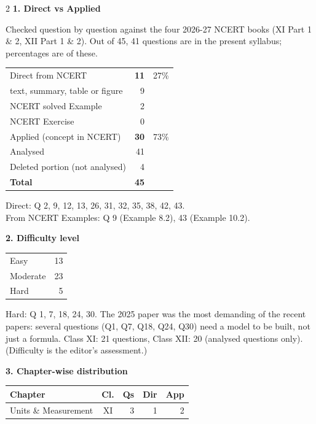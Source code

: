 \begin{multicols}{2}
\textbf{\color{crimson}1. Direct vs Applied}\par\smallskip
{\footnotesize Checked question by question against the four 2026-27 NCERT books (XI Part 1 \& 2, XII Part 1 \& 2). Out of 45, 41 questions are in the present syllabus; percentages are of these.}\par\smallskip
\begin{tabular}{@{}lrr@{}}\toprule
Direct from NCERT & \textbf{11} & 27\%\\
\quad text, summary, table or figure & 9 &\\
\quad NCERT solved Example & 2 &\\
\quad NCERT Exercise & 0 &\\
Applied (concept in NCERT) & \textbf{30} & 73\%\\\midrule
Analysed & 41 &\\
Deleted portion (not analysed) & 4 &\\\midrule
\textbf{Total} & \textbf{45} &\\\bottomrule\end{tabular}\par\smallskip
{\footnotesize Direct: Q 2, 9, 12, 13, 26, 31, 32, 35, 38, 42, 43.\\ From NCERT Examples: Q 9 (Example 8.2), 43 (Example 10.2).}\par\medskip
\textbf{\color{crimson}2. Difficulty level}\par\smallskip
\begin{tabular}{@{}lr@{}}\toprule
Easy & 13\\ Moderate & 23\\ Hard & 5\\\bottomrule\end{tabular}\par\smallskip
{\footnotesize Hard: Q 1, 7, 18, 24, 30. The 2025 paper was the most demanding of the recent papers: several questions (Q1, Q7, Q18, Q24, Q30) need a model to be built, not just a formula. Class XI: 21 questions, Class XII: 20 (analysed questions only). (Difficulty is the editor's assessment.)}\par\medskip
\columnbreak
\textbf{\color{crimson}3. Chapter-wise distribution}\par\smallskip
{\footnotesize\begin{tabular}{@{}p{4.7cm}c@{\,}r@{\,}r@{\,}r@{}}\toprule
Chapter & Cl. & Qs & Dir & App\\\midrule
Units \& Measurement & XI & 3 & 1 & 2\\

\end{tabular}}
\end{multicols}
